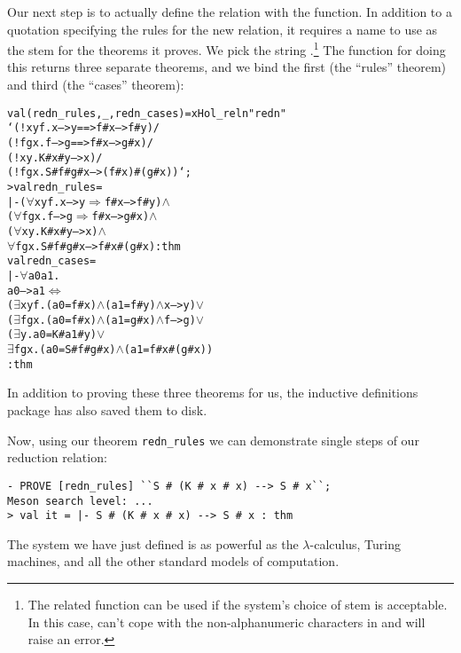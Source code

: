 Our next step is to actually define the relation with the
 function.  In addition to a quotation specifying the
rules for the new relation, it requires a name to use as the stem for
the theorems it proves.  We pick the string .\footnote{The
  related function  can be used if the system's choice
  of stem is acceptable.  In this case,  can't cope with the
  non-alphanumeric characters in \holtxt{-->} and will raise an
  error.}
The  function for
doing this returns three separate theorems, and we bind the first (the
``rules'' theorem) and
third (the ``cases'' theorem):
\begin{session}
\begin{alltt}
val (redn_rules, _, redn_cases) = xHol_reln "redn"
   `(!x y f. x --> y   ==>    f # x --> f # y) /\bs
    (!f g x. f --> g   ==>    f # x --> g # x) /\bs
    (!x y.   K # x # y --> x) /\bs
    (!f g x. S # f # g # x --> (f # x) # (g # x))`;
> val redn_rules =
    |- (\(\forall\)x y f. x --> y \(\Rightarrow\) f # x --> f # y) \(\land\)
       (\(\forall\)f g x. f --> g \(\Rightarrow\) f # x --> g # x) \(\land\)
       (\(\forall\)x y. K # x # y --> x) \(\land\)
       \(\forall\)f g x. S # f # g # x --> f # x # (g # x) : thm
  val redn_cases =
    |- \(\forall\)a0 a1.
         a0 --> a1 \(\Leftrightarrow\)
         (\(\exists\)x y f. (a0 = f # x) \(\land\) (a1 = f # y) \(\land\) x --> y) \(\lor\)
         (\(\exists\)f g x. (a0 = f # x) \(\land\) (a1 = g # x) \(\land\) f --> g) \(\lor\)
         (\(\exists\)y. a0 = K # a1 # y) \(\lor\)
         \(\exists\)f g x. (a0 = S # f # g # x) \(\land\) (a1 = f # x # (g # x))
    : thm
\end{alltt}
\end{session}

In addition to proving these three theorems for us, the inductive
definitions package has also saved them to disk.

Now, using our theorem \texttt{redn\_rules} we can demonstrate single
steps of our reduction relation:
\begin{session}
\begin{verbatim}
- PROVE [redn_rules] ``S # (K # x # x) --> S # x``;
Meson search level: ...
> val it = |- S # (K # x # x) --> S # x : thm
\end{verbatim}
\end{session}
The system we have just defined is as powerful as the
$\lambda$-calculus, Turing machines, and all the other standard models
of computation.

